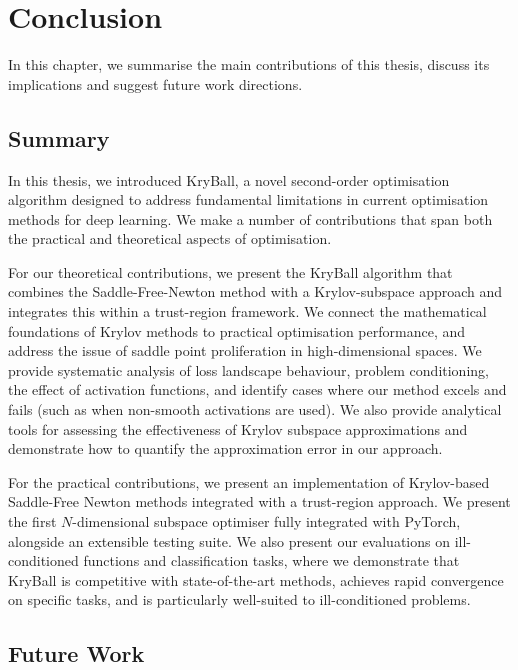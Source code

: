 \chapter{Conclusion}
\label{chap:conclusion}

In this chapter, we summarise the main contributions of this thesis, discuss its implications and suggest future work directions.

\section{Summary}

In this thesis, we introduced KryBall, a novel second-order optimisation algorithm designed to address fundamental limitations in current optimisation methods for deep learning. We make a number of contributions that span both the practical and theoretical aspects of optimisation. 

For our theoretical contributions, we present the KryBall algorithm that combines the Saddle-Free-Newton method with a Krylov-subspace approach and integrates this within a trust-region framework. We connect the mathematical foundations of Krylov methods to practical optimisation performance, and address the issue of saddle point proliferation in high-dimensional spaces. We provide systematic analysis of loss landscape behaviour, problem conditioning, the effect of activation functions, and identify cases where our method excels and fails (such as when non-smooth activations are used). We also provide analytical tools for assessing the effectiveness of Krylov subspace approximations and demonstrate how to quantify the approximation error in our approach.

For the practical contributions, we present an implementation of Krylov-based Saddle-Free Newton methods integrated with a trust-region approach. We present the first $N$-dimensional subspace optimiser fully integrated with PyTorch, alongside an extensible testing suite. We also present our evaluations on ill-conditioned functions and classification tasks, where we demonstrate that KryBall is competitive with state-of-the-art methods, achieves rapid convergence on specific tasks, and is particularly well-suited to ill-conditioned problems.

\section{Future Work}
\label{sec:future_work}

